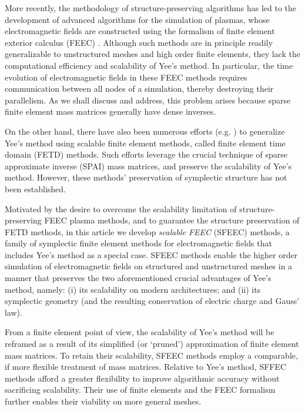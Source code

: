 \documentclass[final,twocolumn]{elsarticle}
\begin{document}
More recently, the methodology of structure-preserving algorithms has led to the development of advanced algorithms for the simulation of plasmas, whose electromagnetic fields are constructed using the formalism of finite element exterior calculus (FEEC) \cite{arnold_finite_2006,arnold_finite_2010,kraus_gempic:_2017,glasser_gauge-compatible_2022}. Although such methods are in principle readily generalizable to unstructured meshes and high order finite elements, they lack the computational efficiency and scalability of Yee's method. In particular, the time evolution of electromagnetic fields in these FEEC methods requires communication between all nodes of a simulation, thereby destroying their parallelism. As we shall discuss and address, this problem arises because sparse finite element mass matrices generally have dense inverses.

On the other hand, there have also been numerous efforts (e.g. \cite{bo_he_sparse_2006,he_differential_2007,kim_parallel_2011,teixeira_differential_2013}) to generalize Yee's method using scalable finite element methods, called finite element time domain (FETD) methods. Such efforts leverage the crucial technique of sparse approximate inverse (SPAI) mass matrices, and preserve the scalability of Yee's method. However, these methods' preservation of symplectic structure has not been established.

Motivated by the desire to overcome the scalability limitation of structure-preserving FEEC plasma methods, and to guarantee the structure preservation of FETD methods, in this article we develop \emph{scalable FEEC} (SFEEC) methods, a family of symplectic finite element methods for electromagnetic fields that includes Yee's method as a special case. SFEEC methods enable the higher order simulation of electromagnetic fields on structured and unstructured meshes in a manner that preserves the two aforementioned crucial advantages of Yee's method, namely: (i) its scalability on modern architectures; and (ii) its symplectic geometry (and the resulting conservation of electric charge and Gauss' law).

From a finite element point of view, the scalability of Yee's method will be reframed as a result of its simplified (or `pruned') approximation of finite element mass matrices. To retain their scalability, SFEEC methods employ a comparable, if more flexible treatment of mass matrices. Relative to Yee's method, SFFEC methods afford a greater flexibility to improve algorithmic accuracy without sacrificing scalability. Their use of finite elements and the FEEC formalism further enables their viability on more general meshes.
\end{document}
